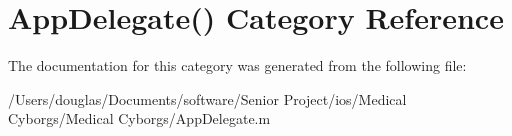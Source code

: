 \hypertarget{category_app_delegate_07_08}{\section{App\-Delegate() Category Reference}
\label{category_app_delegate_07_08}
}


The documentation for this category was generated from the following file\-:\begin{DoxyCompactItemize}
\item 
/\-Users/douglas/\-Documents/software/\-Senior Project/ios/\-Medical Cyborgs/\-Medical Cyborgs/App\-Delegate.\-m\end{DoxyCompactItemize}

